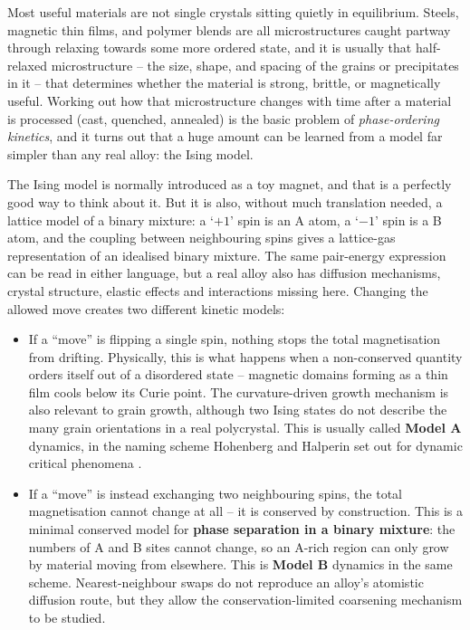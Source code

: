 \documentclass[11pt]{article}
\begin{document}
Most useful materials are not single crystals sitting quietly in
equilibrium. Steels, magnetic thin films, and polymer blends are all
microstructures caught partway through relaxing towards some more ordered
state, and it is usually that half-relaxed microstructure -- the size,
shape, and spacing of the grains or precipitates in it -- that determines
whether the material is strong, brittle, or magnetically useful. Working
out how that microstructure changes with time after a material is
processed (cast, quenched, annealed) is the basic problem of
\emph{phase-ordering kinetics}, and it turns out that a huge amount can be
learned from a model far simpler than any real alloy: the Ising model.

The Ising model is normally introduced as a toy magnet, and that is a
perfectly good way to think about it. But it is also, without much
translation needed, a lattice model of a binary mixture: a `$+1$' spin is
an A atom, a `$-1$' spin is a B atom, and the coupling between neighbouring
spins gives a lattice-gas representation of an idealised binary mixture.
The same pair-energy expression can be read in either language, but a real
alloy also has diffusion mechanisms, crystal structure, elastic effects and
interactions missing here. Changing the allowed move creates two different
kinetic models:

\begin{itemize}
\item If a ``move'' is flipping a single spin, nothing stops the total
magnetisation from drifting. Physically, this is what happens when a
non-conserved quantity orders itself out of a disordered state --
magnetic domains forming as a thin film cools below its Curie point. The
curvature-driven growth mechanism is also relevant to grain growth, although
two Ising states do not describe the many grain orientations in a real
polycrystal. This
is usually called \textbf{Model A} dynamics, in the naming scheme
Hohenberg and Halperin set out for dynamic critical phenomena
\cite{HohenbergHalperin1977}.
\item If a ``move'' is instead exchanging two neighbouring spins, the total
magnetisation cannot change at all -- it is conserved by construction.
This is a minimal conserved model for \textbf{phase separation in a binary
mixture}: the numbers of A and B sites cannot change, so an A-rich region
can only grow by material moving from elsewhere. This is \textbf{Model B}
dynamics in the same scheme. Nearest-neighbour swaps do not reproduce an
alloy's atomistic diffusion route, but they allow the conservation-limited
coarsening mechanism to be studied.
\end{itemize}
\end{document}
